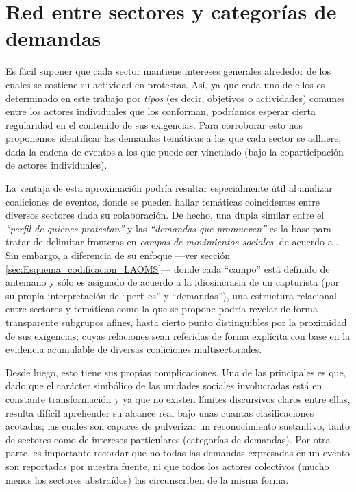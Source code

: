 \documentclass[letterpaper, 11pt]{book}
\theoremstyle{definition}
\theoremstyle{remark}
\begin{document}
\section{Red entre sectores y categorías de demandas}
\label{sec:RedProyectada_tiposCategorias}


Es fácil suponer que cada sector mantiene intereses generales alrededor de los cuales se sostiene su actividad en protestas. 
Así, ya que cada uno de ellos es determinado en este trabajo por \emph{tipos} (es decir, objetivos o actividades) comunes entre los actores individuales que los conforman, podríamos esperar cierta regularidad en el contenido de sus exigencias. 
Para corroborar esto nos proponemos identificar las demandas temáticas a las que cada sector se adhiere, dada la cadena de eventos a los que puede ser vinculado (bajo la coparticipación de actores individuales).


La ventaja de esta aproximación podría resultar especialmente útil al analizar coaliciones de eventos, donde se pueden hallar temáticas coincidentes entre diversos sectores dada su colaboración. 
De hecho, una dupla similar entre el \emph{``perfil de quienes protestan''} y las \emph{``demandas que promueven''} es la base para tratar de delimitar fronteras en \emph{campos de movimientos sociales}, de acuerdo a \citet{2017_Cadena_ManualLAOMS}. 
Sin embargo, a diferencia de su enfoque ---ver sección \ref{sec:Esquema_codificacion_LAOMS}--- donde cada ``campo'' está definido de antemano y sólo es asignado de acuerdo a la idiosincrasia de un capturista (por su propia interpretación de ``perfiles'' y ``demandas''), una estructura relacional entre sectores y temáticas como la que se propone podría revelar de forma transparente subgrupos afines, hasta cierto punto distinguibles por la proximidad de sus exigencias; cuyas relaciones sean referidas de forma explícita con base en la evidencia acumulable de diversas coaliciones multisectoriales. 


Desde luego, esto tiene sus propias complicaciones. 
Una de las principales es que, dado que el carácter simbólico de las unidades sociales involucradas está en constante transformación y ya que no existen límites discursivos claros entre ellas, resulta difícil aprehender su alcance real bajo unas cuantas clasificaciones acotadas; las cuales son capaces de pulverizar un reconocimiento sustantivo, tanto de sectores como de intereses particulares (categorías de demandas). 
Por otra parte, es importante recordar que no todas las demandas expresadas en un evento son reportadas por nuestra fuente, ni que todos los actores colectivos (mucho menos los sectores abstraídos) las circunscriben de la misma forma. 
\end{document}
